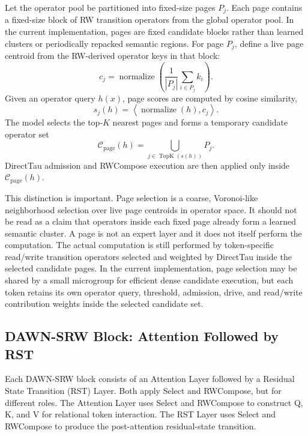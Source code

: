 \documentclass{article}
\begin{document}
Let the operator pool be partitioned into fixed-size pages \(P_j\). Each page contains a fixed-size block of RW transition operators from the global operator pool. In the current implementation, pages are fixed candidate blocks rather than learned clusters or periodically repacked semantic regions. For page \(P_j\), define a live page centroid from the RW-derived operator keys in that block:
\begin{equation}
    c_j=\operatorname{normalize}\left(
        \frac{1}{|P_j|}\sum_{i\in P_j} k_i
    \right).
    \label{eq:method_page_centroid}
\end{equation}
Given an operator query \(h(x)\), page scores are computed by cosine similarity,
\begin{equation}
    s_j(h)=\left\langle \operatorname{normalize}(h),c_j\right\rangle .
    \label{eq:method_page_score}
\end{equation}
The model selects the top-\(K\) nearest pages and forms a temporary candidate operator set
\begin{equation}
    \mathcal{C}_{\mathrm{page}}(h)=
    \bigcup_{j\in\operatorname{TopK}(s(h))}P_j .
    \label{eq:method_page_candidate_set}
\end{equation}
DirectTau admission and RWCompose execution are then applied only inside \(\mathcal{C}_{\mathrm{page}}(h)\).

This distinction is important. Page selection is a coarse, Voronoi-like neighborhood selection over live page centroids in operator space. It should not be read as a claim that operators inside each fixed page already form a learned semantic cluster. A page is not an expert layer and it does not itself perform the computation. The actual computation is still performed by token-specific read/write transition operators selected and weighted by DirectTau inside the selected candidate pages. In the current implementation, page selection may be shared by a small microgroup for efficient dense candidate execution, but each token retains its own operator query, threshold, admission, drive, and read/write contribution weights inside the selected candidate set.

\subsection{DAWN-SRW Block: Attention Followed by RST}

Each DAWN-SRW block consists of an Attention Layer followed by a Residual State Transition (RST) Layer. Both apply Select and RWCompose, but for different roles. The Attention Layer uses Select and RWCompose to construct Q, K, and V for relational token interaction. The RST Layer uses Select and RWCompose to produce the post-attention residual-state transition.
\end{document}
